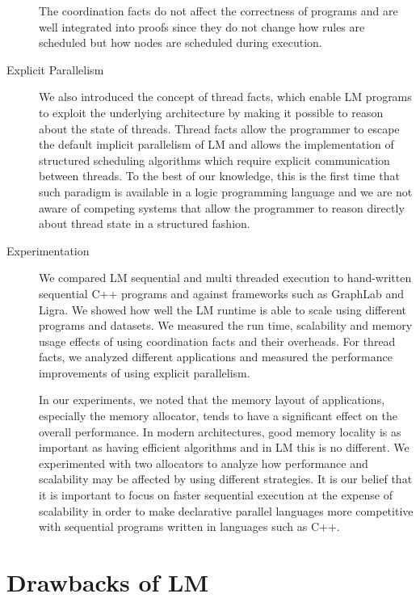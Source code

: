 \begin{description}
The coordination facts do not affect the correctness of programs and are well
integrated into proofs since they do not change how rules are scheduled but how
nodes are scheduled during execution.

\item[Explicit Parallelism]

We also introduced the concept of thread facts, which enable LM programs to
exploit the underlying architecture by making it possible to reason about the
state of threads. Thread facts allow the programmer to escape the default
implicit parallelism of LM and allows the implementation of structured
scheduling algorithms which require explicit communication between threads.
To the best of our knowledge, this is the first time that such paradigm
is available in a logic programming language and we are not aware of competing
systems that allow the programmer to reason directly about thread state in a
structured fashion.

\item[Experimentation]

We compared LM sequential and multi threaded execution to hand-written sequential
C++ programs and against frameworks such as GraphLab and Ligra. We showed how
well the LM runtime is able to scale using different programs and datasets. We
measured the run time, scalability and memory usage effects of using
coordination facts and their overheads. For thread facts, we analyzed different
applications and measured the performance improvements of using explicit
parallelism.

In our experiments, we noted that the memory layout of applications, especially
the memory allocator, tends to have a significant effect on the overall
performance. In modern architectures, good memory locality is as important as
having efficient algorithms and in LM this is no different.
We experimented with two allocators to analyze how
performance and scalability may be affected by using different strategies. It is
our belief that it is important to focus on faster sequential execution at the
expense of scalability in order to make declarative parallel languages more
competitive with sequential programs written in languages such as C++.

\end{description}

\section{Drawbacks of LM}

